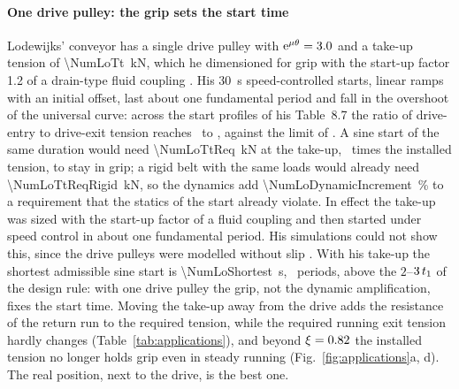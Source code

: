 \paragraph{One drive pulley: the grip sets the start time} Lodewijks' conveyor has a single
drive pulley with $\mathrm{e}^{\mu\theta}=3.0$ and a take-up tension of
\qty{\NumLoTt}{\kilo\newton}, which he dimensioned for grip with the start-up factor 1.2 of a
drain-type fluid coupling \citep[Table~8.2 and Eqs.~8.7--8.9]{lodewijks1996}. His
\qty{30}{\second} speed-controlled starts, linear ramps with an initial offset, last about one
fundamental period and fall in the overshoot of the universal curve: across the start profiles of his Table~8.7 the ratio of
drive-entry to drive-exit tension reaches \NumLoGripRatioMin\ to \NumLoGripRatioMax, against the
limit of \NumLoGripFactor. A sine start of the same duration would need
\qty{\NumLoTtReq}{\kilo\newton} at the take-up, \NumLoSineTtFactor\ times the installed tension,
to stay in grip; a rigid belt with the same loads would already need
\qty{\NumLoTtReqRigid}{\kilo\newton}, so the dynamics add \qty{\NumLoDynamicIncrement}{\percent}
to a requirement that the statics of the start already violate. In effect the take-up was sized
with the start-up factor of a fluid coupling and then started under speed control in about one
fundamental period. His simulations could not show this, since the drive pulleys were modelled
without slip \citep[p.~137]{lodewijks1996}. With his take-up the shortest admissible sine start
is \qty{\NumLoShortest}{\second}, \NumLoShortestOverPeriod\ periods, above the
$2$--$3\,t_{1}$ of the design rule: with one drive pulley the grip, not the dynamic
amplification, fixes the start time. Moving the take-up away from the drive adds the resistance
of the return run to the required tension, while the required running exit tension hardly
changes (Table~\ref{tab:applications}), and beyond $\xi=0.82$ the installed tension no
longer holds grip even in steady running (Fig.~\ref{fig:applications}a, d). The real position,
next to the drive, is the best one.


